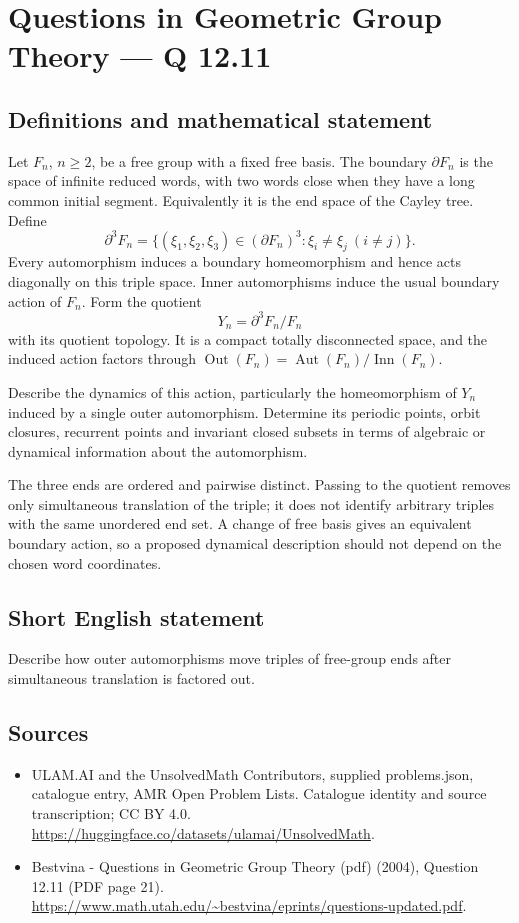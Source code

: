 \documentclass[11pt,a4paper]{article}
\begin{document}
\section*{Questions in Geometric Group Theory — Q 12.11}\label{statement}

\subsection{Definitions and mathematical statement}
Let $F_n$, $n\geq2$, be a free group with a fixed free basis. The boundary $\partial F_n$ is the space of infinite reduced words, with two words close when they have a long common initial segment. Equivalently it is the end space of the Cayley tree. Define
\[
 \partial^3 F_n=\{(\xi_1,\xi_2,\xi_3)\in(\partial F_n)^3:
                                      \xi_i\ne\xi_j\ (i\ne j)\}.
\]
Every automorphism induces a boundary homeomorphism and hence acts diagonally on this triple space. Inner automorphisms induce the usual boundary action of $F_n$. Form the quotient
\[
 Y_n=\partial^3F_n/F_n
\]
with its quotient topology. It is a compact totally disconnected space, and the induced action factors through $\operatorname{Out}(F_n)=\operatorname{Aut}(F_n)/\operatorname{Inn}(F_n)$.

Describe the dynamics of this action, particularly the homeomorphism of $Y_n$ induced by a single outer automorphism. Determine its periodic points, orbit closures, recurrent points and invariant closed subsets in terms of algebraic or dynamical information about the automorphism.

The three ends are ordered and pairwise distinct. Passing to the quotient removes only simultaneous translation of the triple; it does not identify arbitrary triples with the same unordered end set. A change of free basis gives an equivalent boundary action, so a proposed dynamical description should not depend on the chosen word coordinates.
\subsection{Short English statement}
Describe how outer automorphisms move triples of free-group ends after simultaneous translation is factored out.
\subsection{Sources}
\begin{itemize}
\item[S1] ULAM.AI and the UnsolvedMath Contributors, supplied problems.json, catalogue entry, AMR Open Problem Lists. Catalogue identity and source transcription; CC BY 4.0.
\url{https://huggingface.co/datasets/ulamai/UnsolvedMath}.
\item[S2] Bestvina - Questions in Geometric Group Theory (pdf) (2004), Question 12.11 (PDF page 21). 
\url{https://www.math.utah.edu/~bestvina/eprints/questions-updated.pdf}.
\end{itemize}
\end{document}
